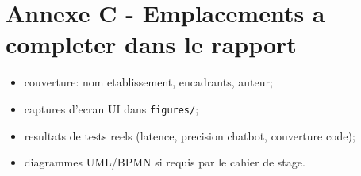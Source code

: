 \section{Annexe C - Emplacements a completer dans le rapport}

\begin{itemize}
  \item couverture: nom etablissement, encadrants, auteur;
  \item captures d'ecran UI dans \texttt{figures/};
  \item resultats de tests reels (latence, precision chatbot, couverture code);
  \item diagrammes UML/BPMN si requis par le cahier de stage.
\end{itemize}
